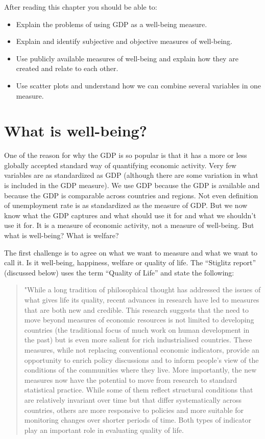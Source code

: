 \documentclass[]{book}
\providecommand{\tightlist}{%
  \setlength{\itemsep}{0pt}\setlength{\parskip}{0pt}}
\begin{document}
After reading this chapter you should be able to:

\begin{itemize}
\tightlist
\item
  Explain the problems of using GDP as a well-being measure.
\item
  Explain and identify subjective and objective measures of well-being.
\item
  Use publicly available measures of well-being and explain how they are created and relate to each other.
\item
  Use scatter plots and understand how we can combine several variables in one measure.
\end{itemize}

\hypertarget{what-is-well-being}{%
\section{What is well-being?}\label{what-is-well-being}}

One of the reason for why the GDP is so popular is that it has a more or less globally accepted standard way of quantifying economic activity. Very few variables are as standardized as GDP (although there are some variation in what is included in the GDP measure). We use GDP because the GDP is available and because the GDP is comparable across countries and regions. Not even definition of unemployment rate is as standardized as the measure of GDP. But we now know what the GDP captures and what should use it for and what we shouldn't use it for. It is a measure of economic activity, not a measure of well-being. But what is well-being? What is welfare?

The first challenge is to agree on what we want to measure and what we want to call it. Is it well-being, happiness, welfare or quality of life. The ``Stiglitz report'' \citep{stiglitz2010report} (discussed below) uses the term ``Quality of Life'' and state the following:

\begin{quote}
"While a long tradition of philosophical thought has addressed the issues of what gives
life its quality, recent advances in research have led to measures that are both new and
credible. This research suggests that the need to move beyond measures of economic
resources is not limited to developing countries (the traditional focus of much work on
human development in the past) but is even more salient for rich industrialised countries.
These measures, while not replacing conventional economic indicators, provide an
opportunity to enrich policy discussions and to inform people's view of the conditions of the
communities where they live. More importantly, the new measures now have the potential to
move from research to standard statistical practice. While some of them reflect structural
conditions that are relatively invariant over time but that differ systematically across
countries, others are more responsive to policies and more suitable for monitoring changes
over shorter periods of time. Both types of indicator play an important role in evaluating
quality of life.
\end{quote}
\end{document}
